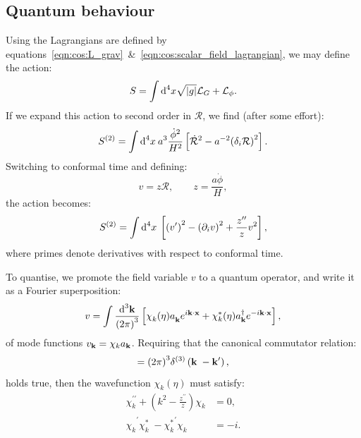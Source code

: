 \subsection{Quantum behaviour}
Using the Lagrangians are defined by equations~\eqref{eqn:cos:L_grav}~\&~\eqref{eqn:cos:scalar_field_lagrangian}, we may define the action:
\begin{equation}
  S = \int \d[4]{x}\sqrt{|g|}\mathcal{L}_G + \mathcal{L}_\phi.
\end{equation}
If we expand this action to second order in $\mathcal{R}$, we find (after some effort):
\begin{equation}
  S^{(2)} = \int \d[4]{x}\: a^3 \frac{\dot{\phi}^2}{H^2}\left[ \mathcal{\dot{R}}^2 -a^{-2}{\left( \delta_i\mathcal{R} \right)}^2 \right].
\end{equation}
Switching to conformal time and defining:
\begin{equation}
  v = z \mathcal{R}, \qquad
  z = \frac{a \dot{\phi}}{H},
\end{equation}
the action becomes:
\begin{equation}
  S^{(2)} = \int \d[4]{x}\: \left[ {\left( v^{\prime} \right)}^2 - {\left( \partial_i v \right)}^2 + \frac{z^{\prime\prime}}{z}v^2\right],
\end{equation}
where primes denote derivatives with respect to conformal time.

To quantise, we promote the field variable $v$ to a quantum operator, and write it as a Fourier superposition:
\begin{equation}
  v = \int \frac{\d[3]{\vk}}{{\left( 2\pi \right)}^3}
  \left[ 
    \chi_k^{\phantom\ast}(\eta) a_\vk^{\phantom\dagger}e^{i\vk\cdot\vx} + 
    \chi_k^\ast(\eta) a_\vk^{\dagger}e^{-i\vk\cdot\vx}  
  \right],
  \label{eqn:cos:mode_func_sum}
\end{equation}
of mode functions $v_\vk = \chi_k a_\vk$.
Requiring that the canonical commutator relation:
\begin{equation}
  [ a_{\vk^{\phantom\prime}}^{\phantom\dagger}, a_{\vk^{\prime}}^{\dagger}] = {\left( 2\pi \right)}^3\delta^{(3)}\left( \vk^{\phantom\prime}-\vk^{\prime} \right),
  \label{eqn:cos:commutator}
\end{equation}
holds true, then the wavefunction $\chi_k(\eta)$ must satisfy:
\begin{align}
  \chi_k^{\prime\prime} + \left( k^2 - \frac{z^{\prime\prime}}{z} \right) \chi_k &=0,
  \label{eqn:cos:mode_func}
  \\
  {\chi_k^{\phantom\ast}}^{\prime} 
  {\chi_k^{\ast}}^{\phantom\prime} 
  -
  {\chi_k^{\ast}}^{\prime} 
  {\chi_k^{\phantom\ast}}^{\phantom\prime} 
  &= -i.
  \label{eqn:cos:mode_func_normalisation}
\end{align}
